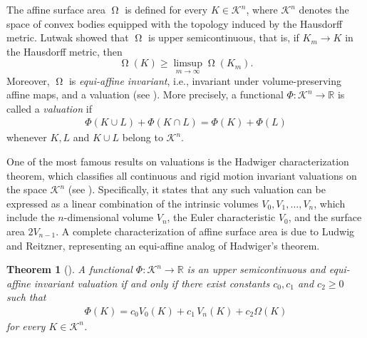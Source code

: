 \documentclass[11pt]{article}
\newtheorem{teo}{Theorem}
\theoremstyle{definition} %
\DeclareMathOperator{\as}{\Omega}
\begin{document}
The affine surface area $\as$ is defined for every $K \in \mathcal{K}^n$, where $\mathcal{K}^n$ denotes the space of convex bodies equipped with the topology induced by the Hausdorff metric. Lutwak \cite{lutwak1991extended} showed that $\as$ is upper semicontinuous, that is, if $K_m \to K$ in the Hausdorff metric, then 
$$ \as(K)\ge \limsup_{m \to \infty} \as(K_m).$$ 
Moreover,
$\as$ is \textit{equi-affine invariant}, i.e., invariant under volume-preserving affine maps, and 
a valuation (see \cite{schutt1993affine}). More precisely, a functional $\Phi: \mathcal{K}^n\rightarrow \mathbb{R}$ is called a \textit{valuation} if 
\begin{align*}
    \Phi(K\cup L)+ \Phi(K\cap L)= \Phi(K)+\Phi(L)
\end{align*}
whenever $K,L$ and  $K\cup L$ belong to $\mathcal{K}^n$.





One of the most famous results 
on valuations is the Hadwiger characterization theorem, which classifies all continuous and rigid motion invariant valuations on the space $\mathcal{K}^n$ (see \cite{hadwiger1957vorlesungen}). Specifically, it states that any such valuation can be expressed as a linear combination of the intrinsic volumes $V_0, V_1, \dots, V_n$,  which include the $n$-dimensional volume $V_n$, the Euler characteristic $V_0$, and the surface area $2V_{n-1}$.
A complete characterization of affine surface area is due to Ludwig and Reitzner, representing an equi-affine 
analog of Hadwiger's theorem.

\begin{teo}[\cite{ludwig1999affine,ludwig1999characterization}]\label{cg}
A functional  $\Phi: \mathcal{K}^n\rightarrow \mathbb{R}$ is an upper semicontinuous and equi-affine invariant valuation if and only if there exist constants $c_0,c_1$ and $c_2\geq 0$ such that
\begin{align*}
    \Phi(K)= c_0V_0(K)+c_1\,V_n(K)+c_2\Omega(K)
\end{align*}
for every $K\in \mathcal{K}^n$.
\end{teo}
\end{document}
